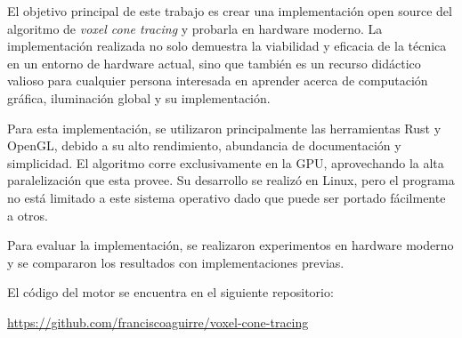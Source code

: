 \documentclass{prgrado}
\begin{document}
El objetivo principal de este trabajo es crear una implementación open source del algoritmo de \textit{voxel cone tracing} y probarla en hardware moderno. La implementación realizada no solo demuestra la viabilidad y eficacia de la técnica en un entorno de hardware actual, sino que también es un recurso didáctico valioso para cualquier persona interesada en aprender acerca de computación gráfica, iluminación global y su implementación.

Para esta implementación, se utilizaron principalmente las herramientas Rust y OpenGL, debido a su alto rendimiento, abundancia de documentación y simplicidad.
El algoritmo corre exclusivamente en la GPU, aprovechando la alta paralelización que esta provee.
Su desarrollo se realizó en Linux, pero el programa no está limitado a este sistema operativo dado que puede ser portado fácilmente a otros.

Para evaluar la implementación, se realizaron experimentos en hardware moderno y se compararon los resultados con implementaciones previas.

El código del motor se encuentra en el siguiente repositorio:

\url{https://github.com/franciscoaguirre/voxel-cone-tracing}

\hfill \break
{}


\tableofcontents
\newpage



\mainmatter %













\backmatter %


\newpage

\printbibliography



\begin{appendix}



\end{appendix}

\end{document}
